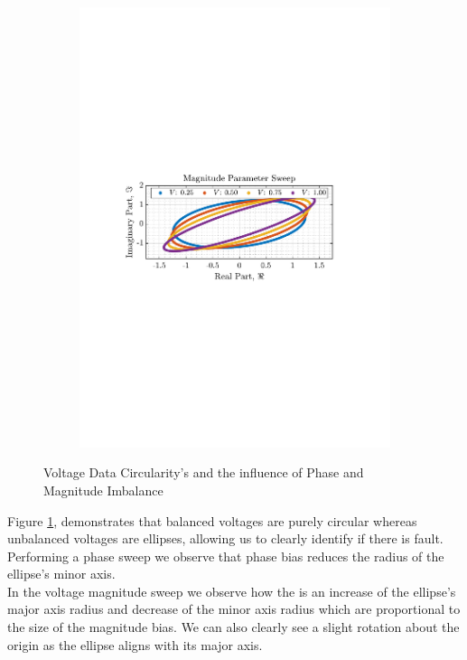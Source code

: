 \documentclass[12pt]{article}
\begin{document}
\begin{figure}[H]
\begin{subfigure}{0.49\textwidth}
					\includegraphics[trim={2.2cm 11.2cm 3.00cm  11.2cm}, clip, width=\textwidth]{../MATLAB/figures/q3_1c_fig04.pdf} 
					\captionsetup{justification=centering}
				\end{subfigure}
					
				\captionsetup{justification=centering}
				\caption{Voltage Data Circularity's and the influence of Phase and Magnitude Imbalance}
				\label{fig: 3-1c}
			\end{figure}
		
			Figure \ref{fig: 3-1c}, demonstrates that balanced voltages are purely circular whereas unbalanced voltages are ellipses, allowing us to clearly identify if there is fault. \\
			Performing a phase sweep we observe that phase bias reduces the radius of the ellipse's minor axis. \\
			In the voltage magnitude sweep we observe how the is an increase of the ellipse's major axis radius and decrease of the minor axis radius which are proportional to the size of the magnitude bias. We can also clearly see a slight rotation about the origin as the ellipse aligns with its major axis. 
			
\end{document}
